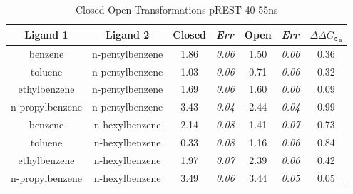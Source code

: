 \documentclass[T4paper.tex]{subfiles}
\begin{document}
\begin{table}[!htb]
\centering
\caption{Closed-Open Transformations pREST 40-55ns}
\label{tbl:C-O_pREST-40-55ns}
\begin{tabular}{|c|c|c|l|c|l|c|}
\hline
\textbf{Ligand 1}                       & \textbf{Ligand 2}                       & {\color[HTML]{800080} \textbf{Closed}} & {\color[HTML]{800080} \textit{Err}} & {\color[HTML]{008000} \textbf{Open}} & {\color[HTML]{008000} \textit{Err}} & \textbf{$\Delta\Delta G_{\boldsymbol{\varepsilon_n}}$}            \\ \hline
\cellcolor[HTML]{800080}benzene         & \cellcolor[HTML]{008000}n-pentylbenzene & 1.86                                   & \textit{0.06}                       & 1.50                                & \textit{0.06}                       & \cellcolor[HTML]{9AFF99}0.36 \\ \hline
\cellcolor[HTML]{800080}toluene         & \cellcolor[HTML]{008000}n-pentylbenzene & 1.03                                   & \textit{0.06}                       & 0.71                                 & \textit{0.06}                       & \cellcolor[HTML]{9AFF99}0.32 \\ \hline
\cellcolor[HTML]{800080}ethylbenzene    & \cellcolor[HTML]{008000}n-pentylbenzene & 1.69                                   & \textit{0.06}                       & 1.60                                 & \textit{0.06}                       & \cellcolor[HTML]{9AFF99}0.09 \\ \hline
\cellcolor[HTML]{800080}n-propylbenzene & \cellcolor[HTML]{008000}n-pentylbenzene & 3.43                                   & \textit{0.04}                       & 2.44                                & \textit{0.04}                       & \cellcolor[HTML]{9AFF99}0.99 \\ \hline
\cellcolor[HTML]{800080}benzene         & \cellcolor[HTML]{008000}n-hexylbenzene  & 2.14                                   & \textit{0.08}                       & 1.41                                & \textit{0.07}                       & \cellcolor[HTML]{9AFF99}0.73 \\ \hline
\cellcolor[HTML]{800080}toluene         & \cellcolor[HTML]{008000}n-hexylbenzene  & 0.33                                   & \textit{0.08}                       & 1.16                                & \textit{0.06}                       & \cellcolor[HTML]{9AFF99}0.84 \\ \hline
\cellcolor[HTML]{800080}ethylbenzene    & \cellcolor[HTML]{008000}n-hexylbenzene  & 1.97                                   & \textit{0.07}                       & 2.39                                & \textit{0.06}                       & \cellcolor[HTML]{9AFF99}0.42 \\ \hline
\cellcolor[HTML]{800080}n-propylbenzene & \cellcolor[HTML]{008000}n-hexylbenzene  & 3.49                                   & \textit{0.06}                       & 3.44                                 & \textit{0.05}                       & \cellcolor[HTML]{9AFF99}0.05 \\ \hline
\end{tabular}


\end{table}
\end{document}

